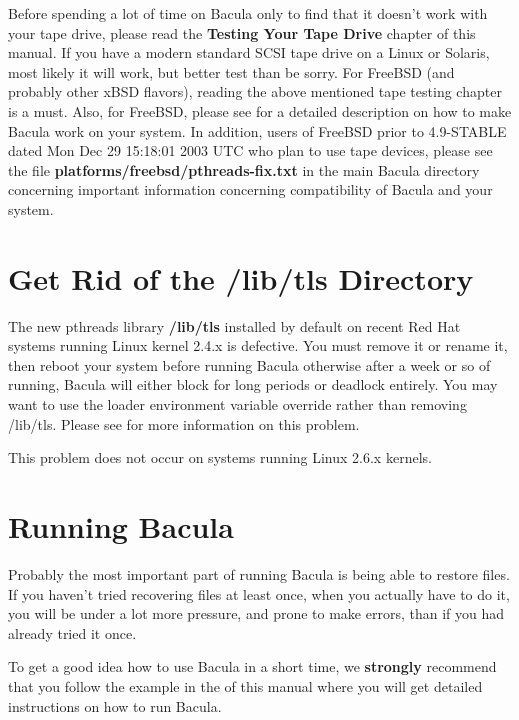 Before spending a lot of time on Bacula only to find that it doesn't work
with your tape drive, please read the {\bf Testing Your Tape
Drive} chapter of this manual.  If you have a modern
standard SCSI tape drive on a Linux or Solaris, most likely it will work,
but better test than be sorry.  For FreeBSD (and probably other xBSD
flavors), reading the above mentioned tape testing chapter is a must.
Also, for FreeBSD, please see  for a detailed description
on how to make Bacula work on your system.  In addition, users of FreeBSD
prior to 4.9-STABLE dated Mon Dec 29 15:18:01 2003 UTC who plan to use tape
devices, please see the file {\bf platforms/freebsd/pthreads-fix.txt} in
the main Bacula directory concerning important information concerning
compatibility of Bacula and your system.  \label{notls}

\section{Get Rid of the /lib/tls Directory}
The new pthreads library {\bf /lib/tls} installed by default on recent Red
Hat systems running Linux kernel 2.4.x is defective.  You must remove it or
rename it, then reboot your system before running Bacula otherwise after a
week or so of running, Bacula will either block for long periods or
deadlock entirely.  You may want to use the loader environment variable
override rather than removing /lib/tls.  Please see  for more information on this problem.

This problem does not occur on systems running Linux 2.6.x kernels. 

\label{Running1}

\section{Running Bacula}

Probably the most important part of running Bacula is being able to restore
files. If you haven't tried recovering files at least once, when you actually
have to do it, you will be under a lot more pressure, and prone to make
errors, than if you had already tried it once. 

To get a good idea how to use Bacula in a short time, we {\bf strongly}
recommend that you follow the example in the 
 of this manual where
you will get detailed instructions on how to run Bacula. 

